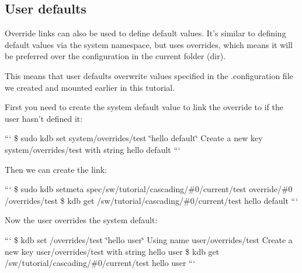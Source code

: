 \subsection*{User defaults}

Override links can also be used to define default values. It's similar to defining default values via the {\ttfamily system} namespace, but uses overrides, which means it will be preferred over the configuration in the current folder ({\ttfamily dir}).

This means that user defaults overwrite values specified in the {\ttfamily .configuration} file we created and mounted earlier in this tutorial.

First you need to create the system default value to link the override to if the user hasn't defined it\+:

``` \$ sudo kdb set system/overrides/test \char`\"{}hello default\char`\"{} Create a new key system/overrides/test with string hello default ```

Then we can create the link\+:

``` \$ sudo kdb setmeta spec/sw/tutorial/cascading/\#0/current/test override/\#0 /overrides/test \$ kdb get /sw/tutorial/cascading/\#0/current/test hello default ```

Now the user overrides the system default\+:

``` \$ kdb set /overrides/test \char`\"{}hello user\char`\"{} Using name user/overrides/test Create a new key user/overrides/test with string hello user \$ kdb get /sw/tutorial/cascading/\#0/current/test hello user ``` 